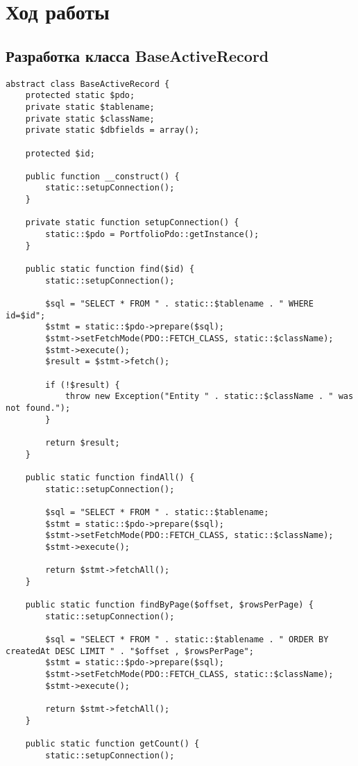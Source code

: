\documentclass[a4paper,14pt]{extarticle}
\begin{document}
\section{Ход работы}
\subsection{Разработка класса BaseActiveRecord}
\begin{lstlisting}
abstract class BaseActiveRecord {
    protected static $pdo;
    private static $tablename;
    private static $className;
    private static $dbfields = array();

    protected $id;

    public function __construct() {
        static::setupConnection();
    }

    private static function setupConnection() {
        static::$pdo = PortfolioPdo::getInstance();
    }

    public static function find($id) {
        static::setupConnection();

        $sql = "SELECT * FROM " . static::$tablename . " WHERE id=$id";
        $stmt = static::$pdo->prepare($sql);
        $stmt->setFetchMode(PDO::FETCH_CLASS, static::$className);
        $stmt->execute();
        $result = $stmt->fetch();

        if (!$result) {
            throw new Exception("Entity " . static::$className . " was not found.");
        }

        return $result;
    }

    public static function findAll() {
        static::setupConnection();

        $sql = "SELECT * FROM " . static::$tablename;
        $stmt = static::$pdo->prepare($sql);
        $stmt->setFetchMode(PDO::FETCH_CLASS, static::$className);
        $stmt->execute();

        return $stmt->fetchAll();
    }

    public static function findByPage($offset, $rowsPerPage) {
        static::setupConnection();

        $sql = "SELECT * FROM " . static::$tablename . " ORDER BY createdAt DESC LIMIT " . "$offset , $rowsPerPage";
        $stmt = static::$pdo->prepare($sql);
        $stmt->setFetchMode(PDO::FETCH_CLASS, static::$className);
        $stmt->execute();

        return $stmt->fetchAll();
    }

    public static function getCount() {
        static::setupConnection();


\end{lstlisting}
\end{document}
